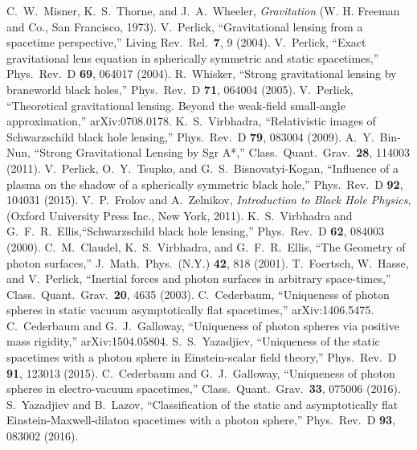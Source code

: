 \documentclass[twocolumn,showpacs,preprintnumbers,amsmath,amssymb,floatfix,nofootinbib]{revtex4-1}
\begin{document}
\begin{thebibliography}{99}

 C.~W.~Misner, K.~S.~Thorne, and J.~A.~Wheeler, {\em Gravitation} (W. H. Freeman and Co., San Francisco, 1973).
 V.~Perlick, ``Gravitational lensing from a spacetime perspective,'' Living Rev.\ Rel.\  {\bf 7}, 9 (2004).
 V.~Perlick, ``Exact gravitational lens equation in spherically symmetric and static spacetimes,'' Phys.\ Rev.\ D {\bf 69}, 064017 (2004).
 R.~Whisker, ``Strong gravitational lensing by braneworld black holes,'' Phys.\ Rev.\ D {\bf 71}, 064004 (2005).
 V.~Perlick, ``Theoretical gravitational lensing. Beyond the weak-field small-angle approximation,'' arXiv:0708.0178.
 K.~S.~Virbhadra, ``Relativistic images of Schwarzschild black hole lensing,'' Phys.\ Rev.\ D {\bf 79}, 083004 (2009).
 A.~Y.~Bin-Nun, ``Strong Gravitational Lensing by Sgr A*,'' Class.\ Quant.\ Grav.\  {\bf 28}, 114003 (2011).
 V.~Perlick, O.~Y.~Tsupko, and G.~S.~Bisnovatyi-Kogan, ``Influence of a plasma on the shadow of a spherically symmetric black hole,'' Phys.\ Rev.\ D {\bf 92}, 104031 (2015).
 V.~P.~Frolov and A.~Zelnikov, {\em Introduction to Black Hole Physics}, (Oxford University Press Inc., New York, 2011).
 K.~S.~Virbhadra and G.~F.~R.~Ellis,``Schwarzschild black hole lensing,'' Phys.\ Rev.\ D {\bf 62}, 084003 (2000).
 C.~M.~Claudel, K.~S.~Virbhadra, and G.~F.~R.~Ellis, ``The Geometry of photon surfaces,''
J.\ Math.\ Phys.\  (N.Y.) {\bf 42}, 818 (2001).
 T.~Foertsch, W.~Hasse, and V.~Perlick, ``Inertial forces and photon surfaces in arbitrary space-times,'' Class.\ Quant.\ Grav.\  {\bf 20}, 4635 (2003).
 C.~Cederbaum, ``Uniqueness of photon spheres in static vacuum asymptotically flat spacetimes,'' arXiv:1406.5475.
 C.~Cederbaum and G.~J.~Galloway, ``Uniqueness of photon spheres via positive mass rigidity,'' arXiv:1504.05804.
 S.~S.~Yazadjiev, ``Uniqueness of the static spacetimes with a photon sphere in Einstein-scalar field theory,'' Phys.\ Rev.\ D {\bf 91}, 123013 (2015).
 C.~Cederbaum and G.~J.~Galloway, ``Uniqueness of photon spheres in electro-vacuum spacetimes,'' Class.\ Quant.\ Grav.\  {\bf 33}, 075006 (2016).
 S.~Yazadjiev and B.~Lazov, ``Classification of the static and asymptotically flat Einstein-Maxwell-dilaton spacetimes with a photon sphere,'' Phys.\ Rev.\ D {\bf 93}, 083002 (2016).

\end{thebibliography}
\end{document}
